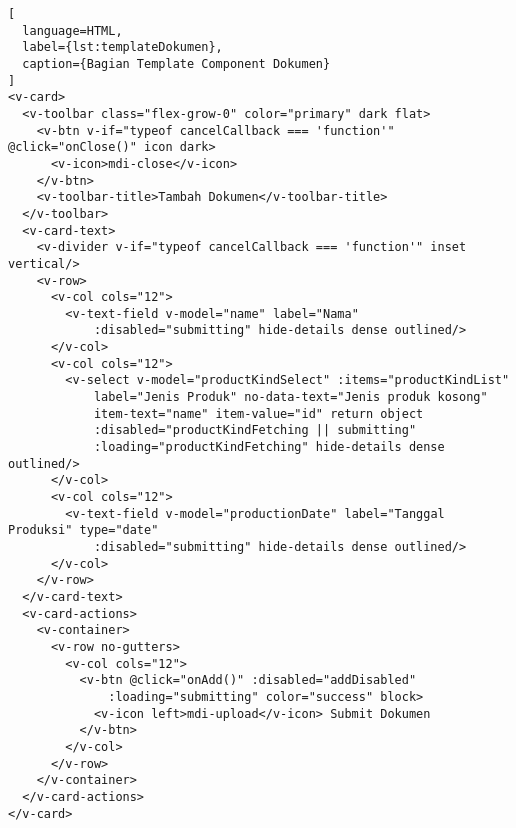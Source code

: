 \begin{lstlisting}[
  language=HTML,
  label={lst:templateDokumen},
  caption={Bagian Template Component Dokumen}
]
<v-card>
  <v-toolbar class="flex-grow-0" color="primary" dark flat>
    <v-btn v-if="typeof cancelCallback === 'function'" @click="onClose()" icon dark>
      <v-icon>mdi-close</v-icon>
    </v-btn>
    <v-toolbar-title>Tambah Dokumen</v-toolbar-title>
  </v-toolbar>
  <v-card-text>
    <v-divider v-if="typeof cancelCallback === 'function'" inset vertical/>
    <v-row>
      <v-col cols="12">
        <v-text-field v-model="name" label="Nama"
            :disabled="submitting" hide-details dense outlined/>
      </v-col>
      <v-col cols="12">
        <v-select v-model="productKindSelect" :items="productKindList"
            label="Jenis Produk" no-data-text="Jenis produk kosong"
            item-text="name" item-value="id" return object
            :disabled="productKindFetching || submitting"
            :loading="productKindFetching" hide-details dense outlined/>
      </v-col>
      <v-col cols="12">
        <v-text-field v-model="productionDate" label="Tanggal Produksi" type="date"
            :disabled="submitting" hide-details dense outlined/>
      </v-col>
    </v-row>
  </v-card-text>
  <v-card-actions>
    <v-container>
      <v-row no-gutters>
        <v-col cols="12">
          <v-btn @click="onAdd()" :disabled="addDisabled"
              :loading="submitting" color="success" block>
            <v-icon left>mdi-upload</v-icon> Submit Dokumen
          </v-btn>
        </v-col>
      </v-row>
    </v-container>
  </v-card-actions>
</v-card>
\end{lstlisting}
\vspace{0.5ex}

\newpage

